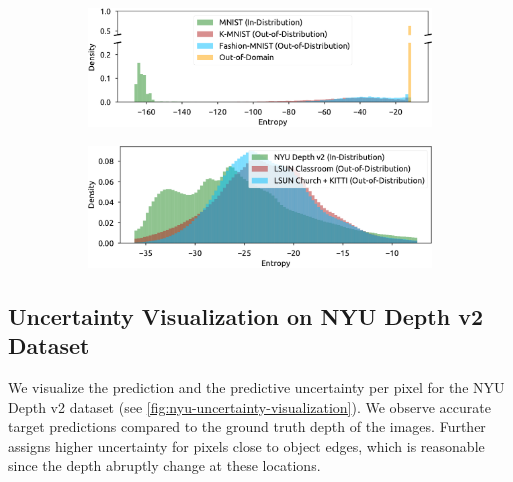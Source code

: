 \begin{figure}[ht!]
    \centering
    \caption{Histogram of the entropy of the posterior distribution accounting for the predictive uncertainty of \NatPNacro{} on MNIST (ID) vs KMNIST, Fashion-MNIST, Out-Of-Domain (OOD) and NYU (ID) vs LSUN classroom and LSUN church + KITTI (OOD). In both cases, low entropy is a good indicator of in-distribution data.}
    \label{fig:entropy-histograms}
    \begin{subfigure}[t]{.5\textwidth}
        \centering
    \includegraphics[width=1.\textwidth]{sections/007_iclr2022/resources/appendix/mnist-entropy-new.pdf}
    \end{subfigure}%
    \begin{subfigure}[t]{.5\textwidth}
        \centering
    \includegraphics[width=1.0\textwidth]{sections/007_iclr2022/resources/appendix/nyu-entropy-new-ii.pdf}
    \end{subfigure}%
\end{figure}

\subsection{Uncertainty Visualization on NYU Depth v2 Dataset}

We visualize the prediction and the predictive uncertainty per pixel for the NYU Depth v2 dataset (see \cref{fig:nyu-uncertainty-visualization}). We observe accurate target predictions compared to the ground truth depth of the images. Further \NatPNacro{} assigns higher uncertainty for pixels close to object edges, which is reasonable since the depth abruptly change at these locations.

